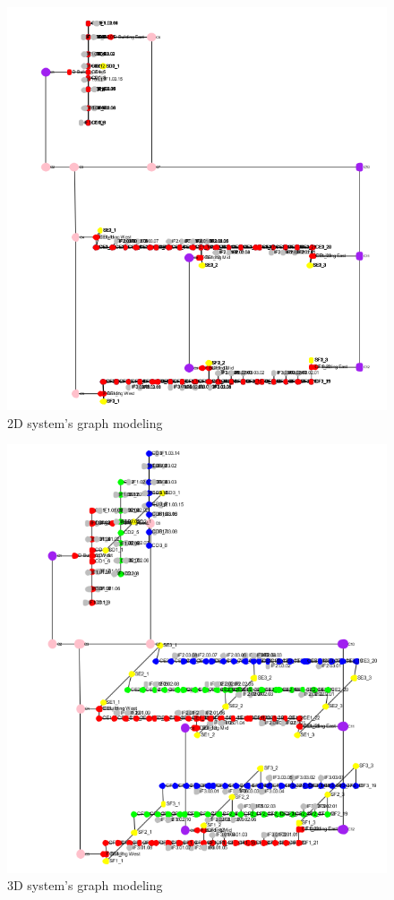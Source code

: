 \begin{figure}[h!]
	\centering
	\includegraphics[scale=0.5]{figure18.PNG}
	\caption{2D system's graph modeling}
	\label{fig:figure18}
\end{figure}

\begin{figure}[h!]
	\centering
	\includegraphics[scale=0.5]{figure15.PNG}
	\caption{3D system's graph modeling}
	\label{fig:figure15}
\end{figure}

